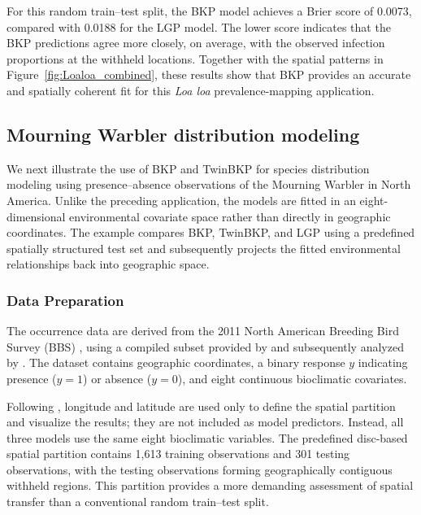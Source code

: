 \documentclass[article, shortnames]{jss}
\begin{document}
For this random train--test split, the BKP model achieves a Brier score of 0.0073, compared with 0.0188 for the LGP model.
The lower score indicates that the BKP predictions agree more closely, on average, with the observed infection proportions at the withheld locations.
Together with the spatial patterns in Figure~\ref{fig:Loaloa_combined}, these results show that BKP provides an accurate and spatially coherent fit for this \emph{Loa loa} prevalence-mapping application.

\subsection{Mourning Warbler distribution modeling}\label{sec:warbler}

We next illustrate the use of BKP and TwinBKP for species distribution modeling using presence--absence observations of the Mourning Warbler in North America.
Unlike the preceding application, the models are fitted in an eight-dimensional environmental covariate space rather than directly in geographic coordinates.
The example compares BKP, TwinBKP, and LGP using a predefined spatially structured test set and subsequently projects the fitted environmental relationships back into geographic space.

\subsubsection{Data Preparation} 

The occurrence data are derived from the 2011 North American Breeding Bird Survey (BBS) \citep{sauer2014north}, using a compiled subset provided by \citet{harris2015generating} and subsequently analyzed by \citet{golding2016fast}.
The dataset contains geographic coordinates, a binary response $y$ indicating presence ($y=1$) or absence ($y=0$), and eight continuous bioclimatic covariates.

Following \citet{golding2016fast}, longitude and latitude are used only to define the spatial partition and visualize the results; they are not included as model predictors.
Instead, all three models use the same eight bioclimatic variables.
The predefined disc-based spatial partition contains 1,613 training observations and 301 testing observations, with the testing observations forming geographically contiguous withheld regions.
This partition provides a more demanding assessment of spatial transfer than a conventional random train--test split.
\end{document}
